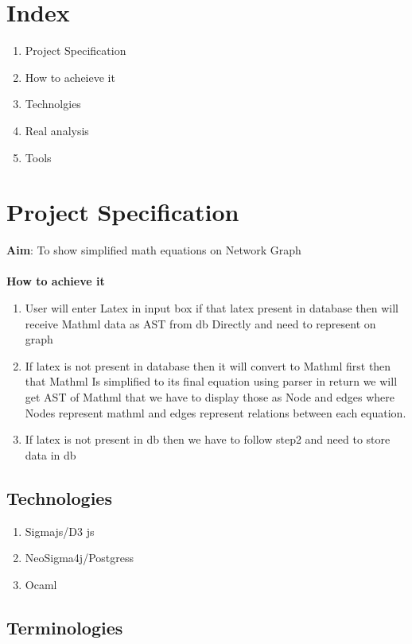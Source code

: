 \documentclass[15]{article}
\begin{document}
\section{Index}
\begin{enumerate}
\item Project Specification 
\item How to acheieve it 
\item Technolgies
\item Real analysis
\item Tools
\end{enumerate}
\pagebreak 
\section{Project Specification}

\textbf{Aim}: To show simplified math equations on Network Graph\\
\\
\textbf{How to achieve it}
\
\begin{enumerate}

\item User will enter Latex in input box if that latex present in database then will receive Mathml data as AST from db Directly and need to represent on graph


\item If latex is not present in database then it will convert to Mathml first then that Mathml
Is simplified to its final equation using parser in return we will get AST of Mathml that we have to display those as Node and edges where Nodes represent mathml and edges represent relations between each equation.

\item If latex is not present in db then we have to follow step2 and need to store data in db
\end{enumerate}

\subsection*{Technologies}


\begin{enumerate}
\item Sigmajs/D3 js
\item NeoSigma4j/Postgress
\item Ocaml 
   
\end{enumerate}

\subsection*{Terminologies}
\end{document}
